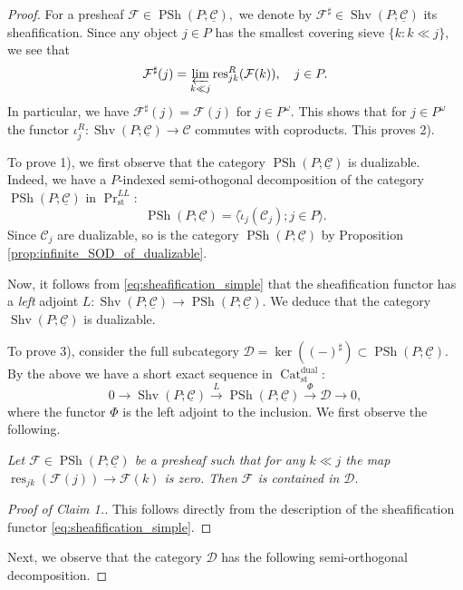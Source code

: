 \documentclass[11pt,leqno]{amsart}
\numberwithin{equation}{section}
\newcommand{\limproj}{\varprojlim}
\newcommand{\xto}{\xrightarrow}
\newcommand{\Cat}{\operatorname{Cat}}
\newcommand{\st}{\operatorname{st}}
\newcommand{\dual}{\operatorname{dual}}
\newcommand{\cF}{{\mathcal F}}
\newcommand{\cD}{{\mathcal D}}
\newcommand{\cC}{{\mathcal C}}
\newcommand{\un}{\underline}
\newcommand{\PSh}{\operatorname{PSh}}
\newcommand{\Sh}{\operatorname{Shv}}
\newcommand{\res}{\operatorname{res}}
\begin{document}
\begin{proof}For a presheaf $\cF\in\PSh(P;\un{\cC}),$ we denote by $\cF^{\sharp}\in\Sh(P;\un{\cC})$ its sheafification. Since any object $j\in P$ has the smallest covering sieve $\{k: k\ll j\},$ we see that
\begin{equation}\label{eq:sheafification_simple}\cF^{\sharp}(j)=\limproj\limits_{k\ll j}\res_{jk}^R(\cF(k)),\quad j\in P.\end{equation} In particular, we have $\cF^{\sharp}(j)=\cF(j)$ for $j\in P^{\omega}.$ This shows that for $j\in P^{\omega}$ the functor $\iota_j^R:\Sh(P;\un{\cC})\to\cC$ commutes with coproducts. This proves 2).

To prove 1), we first observe that the category $\PSh(P;\un{\cC})$ is dualizable. Indeed, we have a $P$-indexed semi-othogonal decomposition of the category $\PSh(P;\un{\cC})$ in $\Pr^{LL}_{\st}:$ \begin{equation}\label{eq:SOD_for_PSh}
\PSh(P;\un{\cC})=\langle \tilde{\iota}_j(\cC_j); j\in P \rangle.\end{equation}
Since $\cC_j$ are dualizable, so is the category $\PSh(P;\un{\cC})$ by Proposition \ref{prop:infinite_SOD_of_dualizable}.

Now, it follows from \eqref{eq:sheafification_simple} that the sheafification functor has a {\it left} adjoint $L:\Sh(P;\un{\cC})\to\PSh(P;\un{\cC}).$ We deduce that the category $\Sh(P;\un{\cC})$ is dualizable.

To prove 3), consider the full subcategory $\cD=\ker((-)^{\sharp})\subset\PSh(P;\un{\cC}).$ By the above we have a short exact sequence in $\Cat_{\st}^{\dual}:$
\begin{equation}\label{eq:resolution_of_Sh_on_P}0\to \Sh(P;\un{\cC})\xto{L}\PSh(P;\un{\cC})\xto{\Phi}\cD\to 0,\end{equation}
where the functor $\Phi$ is the left adjoint to the inclusion. We first observe the following.

{} {\it Let $\cF\in\PSh(P;\un{\cC})$ be a presheaf such that for any $k\ll j$ the map $\res_{jk}(\cF(j))\to\cF(k)$ is zero. Then $\cF$ is contained in $\cD.$}

\begin{proof}[Proof of Claim 1.] This follows directly from the description of the sheafification functor \eqref{eq:sheafification_simple}. \end{proof}

Next, we observe that the category $\cD$ has the following semi-orthogonal decomposition.


\end{proof}
\end{document}
